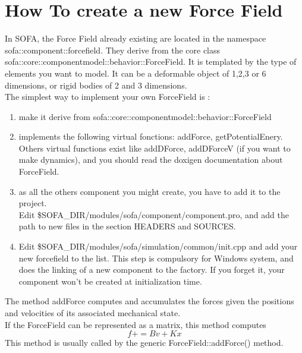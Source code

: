 
\section{How To create a new Force Field}

In SOFA, the Force Field already existing are located in the namespace sofa::component::forcefield. They derive from the core class sofa::core::componentmodel::behavior::ForceField. It is templated by the type of elements you want to model. It can be a deformable object of 1,2,3 or 6 dimensions, or rigid bodies of 2 and 3 dimensions.\\
The simplest way to implement your own ForceField is :
\begin{enumerate}
 \item make it derive from sofa::core::componentmodel::behavior::ForceField
 \item implements the following virtual fonctions: addForce, getPotentialEnery. Others virtual functions exist like  addDForce, addDForceV (if you want to make dynamics), and you should read the doxigen documentation about ForceField. 
 \item as all the others component you might create, you have to add it to the project. \\Edit \$SOFA\_DIR/modules/sofa/component/component.pro, and add the path to new files in the section HEADERS and SOURCES.
 \item Edit \$SOFA\_DIR/modules/sofa/simulation/common/init.cpp and add your new forcefield to the list. This step is compulsory for Windows system, and does the linking of a new component to the factory. If you forget it, your component won't be created at initialization time.
\end{enumerate}

The method addForce computes and accumulates the forces given the positions and velocities of its associated mechanical state.\\
If the ForceField can be represented as a matrix, this method computes
    $$ f += B v + K x $$
     This method is usually called by the generic ForceField::addForce() method.
